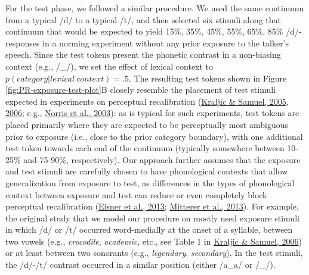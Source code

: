 \documentclass[
  11pt,
  english,
  man,floatsintext]{apa6}
\begin{document}
For the test phase, we followed a similar procedure. We used the same continuum from a typical /d/ to a typical /t/, and then selected six stimuli along that continuum that would be expected to yield 15\%, 35\%, 45\%, 55\%, 65\%, 85\% /d/-responses in a norming experiment without any prior exposure to the talker's speech. Since the test tokens present the phonetic contrast in a non-biasing context (e.g., /\_/), we set the effect of lexical context to \(p(category | lexical\ context) = .5\). The resulting test tokens shown in Figure \ref{fig:PR-exposure-test-plot}B closely resemble the placement of test stimuli expected in experiments on perceptual recalibration (\protect\hyperlink{ref-kraljic-samuel2005}{Kraljic \& Samuel, 2005}, \protect\hyperlink{ref-kraljic-samuel2006}{2006}; e.g., \protect\hyperlink{ref-norris2003}{Norris et al., 2003}): as is typical for such experiments, test tokens are placed primarily where they are expected to be perceptually most ambiguous prior to exposure (i.e., close to the prior category boundary), with one additional test token towards each end of the continuum (typically somewhere between 10-25\% and 75-90\%, respectively). Our approach further assumes that the exposure and test stimuli are carefully chosen to have phonological contexts that allow generalization from exposure to test, as differences in the types of phonological context between exposure and test can reduce or even completely block perceptual recalibration (\protect\hyperlink{ref-eisner2013}{Eisner et al., 2013}; \protect\hyperlink{ref-mitterer2013}{Mitterer et al., 2013}). For example, the original study that we model our procedure on mostly used exposure stimuli in which /d/ or /t/ occurred word-medially at the onset of a syllable, between two vowels (e.g., \emph{crocodile}, \emph{academic}, etc., see Table 1 in \protect\hyperlink{ref-kraljic-samuel2006}{Kraljic \& Samuel, 2006}) or at least between two sonorants (e.g., \emph{legendary}, \emph{secondary}). In the test stimuli, the /d/-/t/ contrast occurred in a similar position (either /a\_a/ or /\_/).
\end{document}
